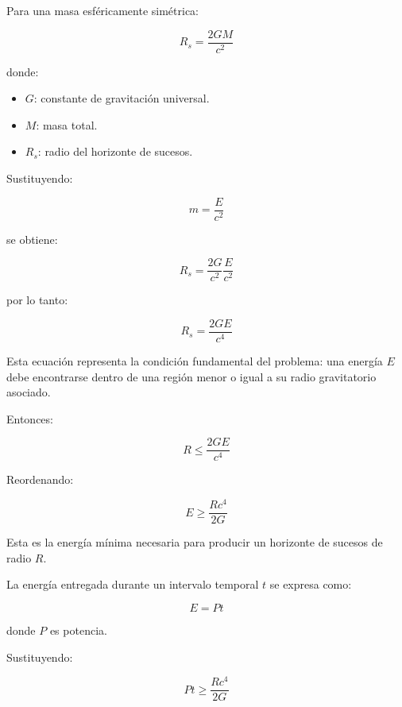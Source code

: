 \documentclass[a4paper,10pt,twocolumn]{article}
\begin{document}
Para una masa esféricamente simétrica:

\begin{equation}
R_s=\frac{2GM}{c^2}
\end{equation}

donde:

\begin{itemize}
\item $G$: constante de gravitación universal.
\item $M$: masa total.
\item $R_s$: radio del horizonte de sucesos.
\end{itemize}

Sustituyendo:

\begin{equation}
m=\frac{E}{c^2}
\end{equation}

se obtiene:

\begin{equation}
R_s=\frac{2G}{c^2}\frac{E}{c^2}
\end{equation}

por lo tanto:

\begin{equation}
\boxed{R_s=\frac{2GE}{c^4}}
\end{equation}

Esta ecuación representa la condición fundamental del problema: una energía $E$ debe encontrarse dentro de una región menor o igual a su radio gravitatorio asociado.

Entonces:

\begin{equation}
R\leq\frac{2GE}{c^4}
\end{equation}

Reordenando:

\begin{equation}
\boxed{E\geq\frac{Rc^4}{2G}}
\end{equation}

Esta es la energía mínima necesaria para producir un horizonte de sucesos de radio $R$.

La energía entregada durante un intervalo temporal $t$ se expresa como:

\begin{equation}
E=Pt
\end{equation}

donde $P$ es potencia.

Sustituyendo:

\begin{equation}
Pt\geq\frac{Rc^4}{2G}
\end{equation}
\end{document}
